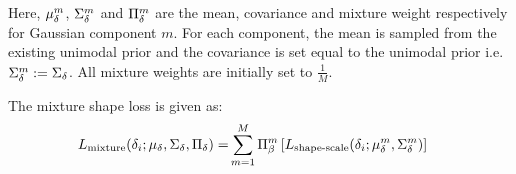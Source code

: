 Here, $\mu_{\delta}^{m}$, $\Sigma_{\delta}^{m}$ and $\Pi_{\delta}^{m}$ are the mean, covariance and mixture weight respectively for Gaussian component 
$m$. For each component, the mean is sampled from the existing unimodal prior and the covariance is set equal to the unimodal prior i.e. $\Sigma_{\delta}^{m} := \Sigma_{\delta}$. All mixture weights are initially set to $\frac{1}{M}$.

The mixture shape loss is given as:
\begin{align}
    L_{\textrm{mixture}}(\delta_{i}; \mu_{\delta}, \Sigma_{\delta}, \Pi_{\delta})
    =&
    \sum_{m=1}^M \Pi_{\beta}^{m} \left[L_{\textrm{shape-scale}}(\delta_{i}; \mu_{\delta}^{m}, \Sigma_{\delta}^{m})\right]
\end{align}





